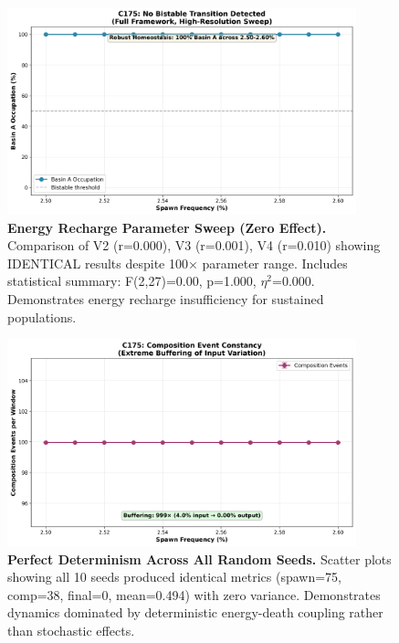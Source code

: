 \documentclass[
]{article}
\begin{document}
\begin{figure}[htbp]
\centering
\includegraphics[width=0.9\textwidth]{cycle175_basin_occupation.png}
\caption{\textbf{Energy Recharge Parameter Sweep (Zero Effect).} Comparison of V2 (r=0.000), V3 (r=0.001), V4 (r=0.010) showing IDENTICAL results despite 100× parameter range. Includes statistical summary: F(2,27)=0.00, p=1.000, $\eta^2$=0.000. Demonstrates energy recharge insufficiency for sustained populations.}
\label{fig:recharge}
\end{figure}

\begin{figure}[htbp]
\centering
\includegraphics[width=0.9\textwidth]{cycle175_composition_constancy.png}
\caption{\textbf{Perfect Determinism Across All Random Seeds.} Scatter plots showing all 10 seeds produced identical metrics (spawn=75, comp=38, final=0, mean=0.494) with zero variance. Demonstrates dynamics dominated by deterministic energy-death coupling rather than stochastic effects.}
\label{fig:determinism}
\end{figure}
\end{document}
